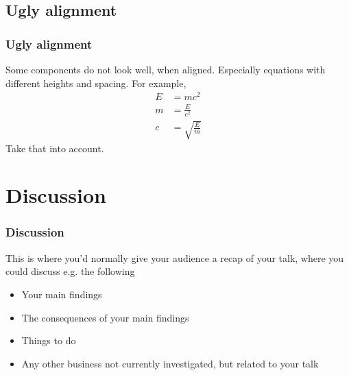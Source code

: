 \documentclass[aspectratio=169]{beamer} %
\begin{document}
\subsection{Ugly alignment}
\begin{frame}
\frametitle{Ugly alignment}
Some components do not look well, when aligned. Especially equations with different heights and spacing. For example, 
\begin{align}
E&=mc^2\\
m&=\frac{E}{c^2}\\
c&=\sqrt{\frac{E}{m}}
\end{align}
Take that into account. 
\end{frame}

\section{Discussion}
\begin{frame}
\frametitle{Discussion}
This is where you'd normally give your audience a recap of your talk, where you could discuss e.g. the following
\begin{itemize}
\item Your main findings
\item The consequences of your main findings
\item Things to do
\item Any other business not currently investigated, but related to your talk
\end{itemize}
\end{frame}
\end{document}
